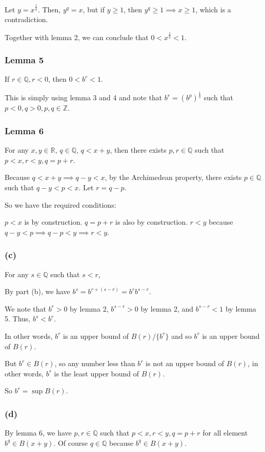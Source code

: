 Let $ y = x^{\frac{1}{q}} $. Then, $ y^q = x $, but if $ y \ge 1 $, then $ y^q \ge 1 \implies x \ge 1 $, which is a contradiction.

Together with lemma 2, we can conclude that $ 0 < x^{\frac{1}{q}} < 1 $.

\subsubsection*{Lemma 5}
If $ r \in \mathbb{Q}, r < 0 $, then $ 0 < b^r < 1 $.

This is simply using lemma 3 and 4 and note that $ b^r = (b^p)^{\frac{1}{q}} $ such that $ p < 0, q > 0, p, q \in \mathbb{Z} $.

\subsubsection*{Lemma 6}
For any $ x,y \in \mathbb{R} $, $ q \in \mathbb{Q} $, $ q < x + y $, then there exists $ p, r\in \mathbb{Q} $ such that $ p < x, r < y, q = p + r $.

Because $ q < x + y \implies q - y < x $, by the Archimedean property, there exists $ p \in \mathbb{Q} $ such that $ q - y < p < x $. Let $ r = q - p $.

So we have the required conditions:

$ p < x $ is by construction.
$ q = p + r $ is also by construction.
$ r < y $ because $ q - y < p \implies q - p < y \implies r < y $.

\subsubsection*{(c)}
For any $ s \in \mathbb{Q} $ such that $ s < r $,

By part (b), we have $ b^s = b^{r + (s - r)} = b^{r} b^{s - r} $.

We note that $ b^r > 0 $ by lemma 2, $ b^{s - r} > 0 $ by lemma 2, and $ b^{s-r} < 1 $ by lemma 5. Thus, $ b^s < b^r $.

In other words, $ b^r $ is an upper bound of $ B(r)/\{b^r\} $ and so $ b^r $ is an upper bound of $ B(r) $.

But $ b^r \in B(r) $, so any number less than $ b^r $ is not an upper bound of $ B(r) $, in other words, $ b^r $ is the least upper bound of $ B(r) $.

So $ b^r = \sup B(r) $.

\subsubsection*{(d)}
By lemma 6, we have $ p, r\in \mathbb{Q} $ such that $ p < x, r < y, q = p + r $ for all element $ b^q \in B(x+y) $.  Of course $ q \in \mathbb{Q} $ because $ b^q \in B(x+y) $.

